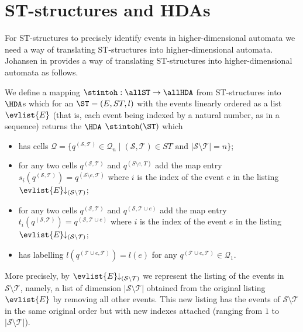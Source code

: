 \section{ST-structures and HDAs}
\label{sec:st-structure-and-hda}

    For ST-structures to precisely identify events in higher-dimensional automata we need a way of translating ST-structures into higher-dimensional automata. Johansen in \cite{Johansen16STstruct} provides a way of translating ST-structures into higher-dimensional automata as follows.

    \begin{definition}
        \label{def:ST-structures-to-HDA}
        We define a mapping $\stintoh : \allST \rightarrow \allHDA$ from ST-structures into $\HDA$s which for an $\ST=(E,ST,l)$ with the events linearly ordered as a list $\evlist{E}$ (that is, each event being indexed by a natural number, as in a sequence) returns the $\HDA$ $\stintoh(\ST)$ which
    
        \begin{itemize}
            \item has cells $\mathcal{Q} = \{q^{(\mathcal{S},\mathcal{T})}\in \mathcal{Q}_{n} \mid (\mathcal{S},\mathcal{T})\in ST \mbox{ and } |\mathcal{S} \setminus \mathcal{T}|=n\}$;
            \item for any two cells $q^{(\mathcal{S},\mathcal{T})}$ and $q^{(S\setminus e,T)}$ add the map entry $s_{i}(q^{(\mathcal{S},\mathcal{T})})=q^{(\mathcal{S} \setminus e,\mathcal{T})}$ where $i$ is the index of the event $e$ in the listing $\evlist{E}\!\!\downarrow_{(\mathcal{S} \setminus \mathcal{T})}$;
            \item for any two cells $q^{(\mathcal{S},\mathcal{T})}$ and $q^{(\mathcal{S},\mathcal{T} \cup e)}$ add the map entry $t_{i}(q^{(\mathcal{S},\mathcal{T})})=q^{(\mathcal{S},\mathcal{T} \cup e)}$ where $i$ is the index of the event $e$ in the listing $\evlist{E}\!\!\downarrow_{(\mathcal{S} \setminus \mathcal{T})}$;
            \item has labelling $l(q^{(\mathcal{T} \cup e,\mathcal{T})})=l(e)$ for any $q^{(\mathcal{T} \cup e,\mathcal{T})}\in \mathcal{Q}_{1}$.
        \end{itemize}

        More precisely, by $\evlist{E}\!\!\downarrow_{(\mathcal{S} \setminus \mathcal{T})}$ we represent the listing of the events in $\mathcal{S} \setminus \mathcal{T}$, namely, a list of dimension $|\mathcal{S} \setminus \mathcal{T}|$ obtained from the original listing $\evlist{E}$ by removing all other events. This new listing has the events of $\mathcal{S} \setminus \mathcal{T}$ in the same original order but with new indexes attached (ranging from $1$ to $|\mathcal{S} \setminus \mathcal{T}|$).
    \end{definition}


